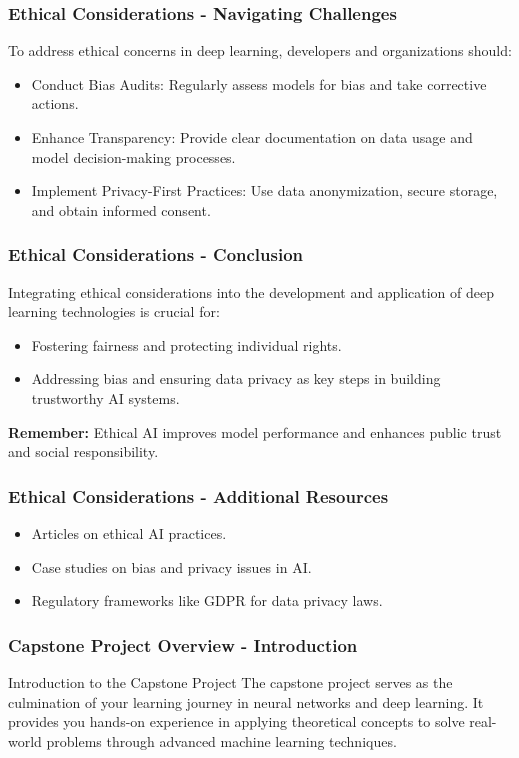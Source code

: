 \documentclass[aspectratio=169]{beamer}
\begin{document}
\begin{frame}[fragile]
  \frametitle{Ethical Considerations - Navigating Challenges}
  To address ethical concerns in deep learning, developers and organizations should:
  \begin{itemize}
      \item Conduct Bias Audits: Regularly assess models for bias and take corrective actions.
      \item Enhance Transparency: Provide clear documentation on data usage and model decision-making processes.
      \item Implement Privacy-First Practices: Use data anonymization, secure storage, and obtain informed consent.
  \end{itemize}
\end{frame}

\begin{frame}[fragile]
  \frametitle{Ethical Considerations - Conclusion}
  Integrating ethical considerations into the development and application of deep learning technologies is crucial for:
  \begin{itemize}
      \item Fostering fairness and protecting individual rights.
      \item Addressing bias and ensuring data privacy as key steps in building trustworthy AI systems.
  \end{itemize}
  \textbf{Remember:} Ethical AI improves model performance and enhances public trust and social responsibility.
\end{frame}

\begin{frame}[fragile]
  \frametitle{Ethical Considerations - Additional Resources}
  \begin{itemize}
      \item Articles on ethical AI practices.
      \item Case studies on bias and privacy issues in AI.
      \item Regulatory frameworks like GDPR for data privacy laws.
  \end{itemize}
\end{frame}

\begin{frame}[fragile]
    \frametitle{Capstone Project Overview - Introduction}
    \begin{block}{Introduction to the Capstone Project}
        The capstone project serves as the culmination of your learning journey in neural networks and deep learning. 
        It provides you hands-on experience in applying theoretical concepts to solve real-world problems through advanced machine learning techniques.
    \end{block}
\end{frame}
\end{document}
